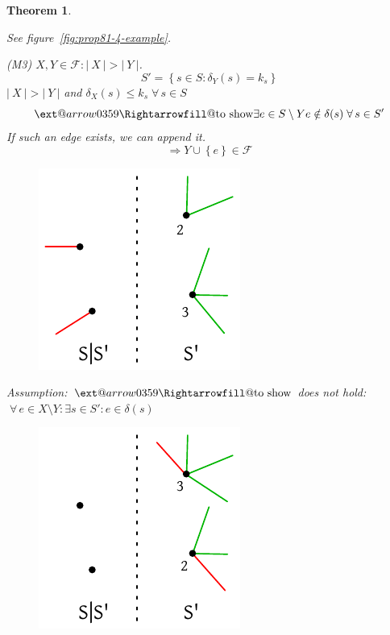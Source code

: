 \documentclass{article}
\makeatletter
\newtheorem{theorem}{Theorem}
\newcommand{\card}[1]{\left|\:\!#1\:\!\right|}
\newcommand{\set}[1]{\left\{#1\right\}}
\newcommand{\fall}{\;\forall\,}
\newcommand{\xRightarrow}[2][]{\ext@arrow 0359\Rightarrowfill@{#1}{#2}}
\makeatother
\begin{document}
\begin{theorem}
\begin{enumerate}
      See figure~\ref{fig:prop81-4-example}.

      (M3) $X, Y \in \mathcal{F}: \card{X} > \card{Y}$.
      \[
        S' = \set{s \in S: \delta_Y(s) = k_s}
      \]
      $\card{X} > \card{Y}$ and $\delta_X(s) \leq k_s \fall s \in S$
      \[
        \xRightarrow{\text{to show}} 
          \exists e \in S \setminus Y
          e \notin \delta(s)
          \fall s \in S'
      \]
      If such an edge exists, we can append it.
      \[
        \Rightarrow Y \cup \set{e} \in \mathcal{F}
      \]

      \begin{figure}[!ht]
        \begin{center}
          \includegraphics{img/matroid_4_edge.pdf}
          \label{fig:prop81-4-edge}
        \end{center}
      \end{figure}

      Assumption: $\xRightarrow{\text{to show}}$ does \emph{not} hold:
      $\fall e \in X \setminus Y: \exists s \in S': e \in \delta(s)$

      \begin{figure}[!ht]
        \begin{center}
          \includegraphics{img/matroid_4_edge2.pdf}
          \label{fig:prop81-4-edge2}
        \end{center}
      \end{figure}


\end{enumerate}
\end{theorem}
\end{document}
